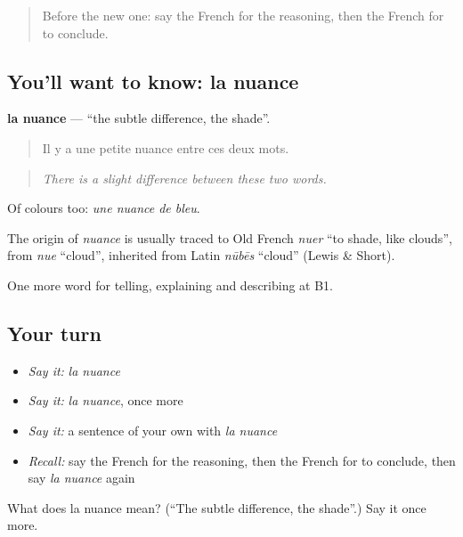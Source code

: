 \begin{quote}
Before the new one: say the French for the reasoning, then the French for to conclude.
\end{quote}

\subsection*{You'll want to know: la nuance}
\textbf{la nuance} — \textquotedblleft{}the subtle difference, the shade\textquotedblright{}.

\begin{quote}
Il y a une petite nuance entre ces deux mots.
\end{quote}

\begin{quote}
\emph{There is a slight difference between these two words.}
\end{quote}

Of colours too: \emph{une nuance de bleu}.

\begin{cousinweb}
The origin of \emph{nuance} is usually traced to Old French \emph{nuer} \textquotedblleft{}to shade, like clouds\textquotedblright{}, from \emph{nue} \textquotedblleft{}cloud\textquotedblright{}, inherited from Latin \emph{nūbēs} \textquotedblleft{}cloud\textquotedblright{} (Lewis \& Short).
\end{cousinweb}

\begin{grammarlens}[title={What you've built}]
One more word for telling, explaining and describing at B1.
\end{grammarlens}

\subsection*{Your turn}
\begin{itemize}
\raggedright
  \item \emph{Say it:} \emph{la nuance}
  \item \emph{Say it:} \emph{la nuance}, once more
  \item \emph{Say it:} a sentence of your own with \emph{la nuance}
  \item \emph{Recall:} say the French for the reasoning, then the French for to conclude, then say \emph{la nuance} again
\end{itemize}

\begin{tcolorbox}[breakable,colback=teal!4,colframe=teal!35!black,title={Before you move on}]
What does la nuance mean? (\textquotedblleft{}The subtle difference, the shade\textquotedblright{}.) Say it once more.
\end{tcolorbox}
